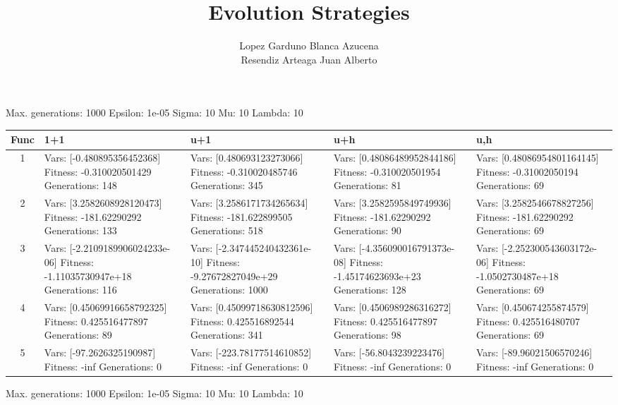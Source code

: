 \documentclass[landscape,11pt]{article}
\begin{document}
\title{Evolution Strategies}
 \author{Lopez Garduno Blanca Azucena\\ Resendiz Arteaga Juan Alberto}
 \maketitle
Max. generations: 1000 Epsilon: 1e-05 Sigma: 10 Mu: 10 Lambda: 10 \\
\begin{tabular}{|c|p{5.4cm}|p{5.4cm}|p{5.4cm}|p{5.4cm}|}
 \hline
 Func & 1+1 & u+1 & u+h & u,h \\ 
 \hline
 1 & Vars: [-0.480895356452368] Fitness: -0.310020501429 Generations: 148 & Vars: [0.480693123273066] Fitness: -0.310020485746 Generations: 345 & Vars: [0.48086489952844186] Fitness: -0.310020501954 Generations: 81 & Vars: [0.48086954801164145] Fitness: -0.31002050194 Generations: 69 \\
 \hline 
 2 & Vars: [3.2582608928120473] Fitness: -181.62290292 Generations: 133 & Vars: [3.2586171734265634] Fitness: -181.622899505 Generations: 518 & Vars: [3.2582595849749936] Fitness: -181.62290292 Generations: 90 & Vars: [3.2582546678827256] Fitness: -181.62290292 Generations: 69 \\
 \hline 
 3 & Vars: [-2.2109189906024233e-06] Fitness: -1.11035730947e+18 Generations: 116 & Vars: [-2.347445240432361e-10] Fitness: -9.27672827049e+29 Generations: 1000 & Vars: [-4.356090016791373e-08] Fitness: -1.45174623693e+23 Generations: 128 & Vars: [-2.252300543603172e-06] Fitness: -1.0502730487e+18 Generations: 69 \\
 \hline 
 4 & Vars: [0.45069916658792325] Fitness: 0.425516477897 Generations: 89 & Vars: [0.45099718630812596] Fitness: 0.425516892544 Generations: 341 & Vars: [0.4506989286316272] Fitness: 0.425516477897 Generations: 98 & Vars: [0.450674255874579] Fitness: 0.425516480707 Generations: 69 \\
 \hline 
 5 & Vars: [-97.2626325190987] Fitness: -inf Generations: 0 & Vars: [-223.78177514610852] Fitness: -inf Generations: 0 & Vars: [-56.8043239223476] Fitness: -inf Generations: 0 & Vars: [-89.96021506570246] Fitness: -inf Generations: 0 \\
 \hline 
\end{tabular}
\newpage
Max. generations: 1000 Epsilon: 1e-05 Sigma: 10 Mu: 10 Lambda: 10 \\
\end{document}
